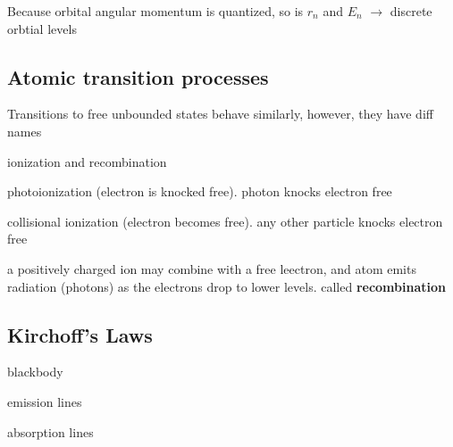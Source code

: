 \documentclass{article}
\begin{document}
\begin{center}
  
  
\end{center}

Because orbital angular momentum is quantized, so is $r_n$ and $E_n$ $\rightarrow$ discrete orbtial levels

\subsection{Atomic transition processes}

\begin{list}{-}{}
\item Transitions to free unbounded states behave similarly, however, they have diff names
\item ionization and recombination
\item photoionization (electron is knocked free). photon knocks electron free
\item collisional ionization (electron becomes free). any other particle knocks electron free
\item a positively charged ion may combine with a free leectron, and atom emits radiation (photons) as the electrons drop to lower levels. called \textbf{recombination}
\end{list}

\subsection{Kirchoff's  Laws}
\begin{list}{-}{}
\item blackbody
\item emission lines
\item absorption lines
\end{list}
\end{document}
